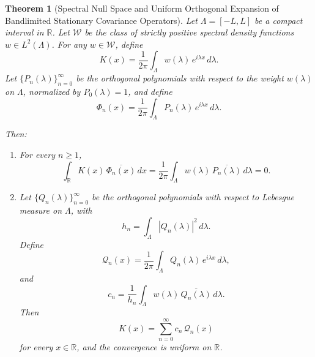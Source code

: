 \documentclass[12pt]{article}
\newtheorem{theorem}{Theorem}
\begin{document}
\begin{theorem}[Spectral Null Space and Uniform Orthogonal Expansion of Bandlimited Stationary Covariance Operators]
Let $\Lambda = [-L,L]$ be a compact interval in $\mathbb{R}$. Let $\mathcal{W}$ be the class of strictly positive spectral density functions $w \in L^2(\Lambda)$. For any $w \in \mathcal{W}$, define
\begin{equation}
    K(x)=\frac{1}{2\pi}\int_{\Lambda} w(\lambda)\,e^{i\lambda x}\,d\lambda .
\end{equation}
Let $\{P_n(\lambda)\}_{n=0}^\infty$ be the orthogonal polynomials with respect to the weight $w(\lambda)$ on $\Lambda$, normalized by $P_0(\lambda)=1$, and define
\begin{equation}
    \Phi_n(x)=\frac{1}{2\pi}\int_{\Lambda} P_n(\lambda)\,e^{i\lambda x}\,d\lambda .
\end{equation}

Then:
\begin{enumerate}
    \item For every $n\ge 1$,
    \begin{equation}
        \int_{\mathbb{R}} K(x)\,\overline{\Phi_n(x)}\,dx
        =
        \frac{1}{2\pi}\int_{\Lambda} w(\lambda)\,\overline{P_n(\lambda)}\,d\lambda
        =0 .
    \end{equation}

    \item Let $\{Q_n(\lambda)\}_{n=0}^\infty$ be the orthogonal polynomials with respect to Lebesgue measure on $\Lambda$, with
    \begin{equation}
        h_n=\int_{\Lambda}|Q_n(\lambda)|^2\,d\lambda .
    \end{equation}
    Define
    \begin{equation}
        \mathcal{Q}_n(x)=\frac{1}{2\pi}\int_{\Lambda} Q_n(\lambda)\,e^{i\lambda x}\,d\lambda ,
    \end{equation}
    and
    \begin{equation}
        c_n=\frac{1}{h_n}\int_{\Lambda} w(\lambda)\,\overline{Q_n(\lambda)}\,d\lambda .
    \end{equation}
    Then
    \begin{equation}
        K(x)=\sum_{n=0}^\infty c_n\,\mathcal{Q}_n(x)
    \end{equation}
    for every $x\in\mathbb{R}$, and the convergence is uniform on $\mathbb{R}$.
\end{enumerate}
\end{theorem}
\end{document}
